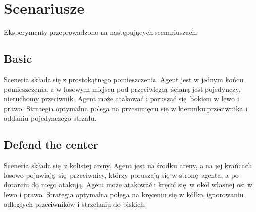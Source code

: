 \section{Scenariusze}
Eksperymenty przeprowadzono na następujących scenariuszach.

\subsection{Basic}
Sceneria składa się z prostokątnego pomieszczenia. Agent jest w jednym końcu pomieszczenia, a w losowym miejscu pod przeciwległą ścianą jest pojedynczy, nieruchomy przeciwnik. Agent może atakować i poruszać się bokiem w lewo i prawo. Strategia optymalna polega na przesunięciu się w kierunku przeciwnika i oddaniu pojedynczego strzału.
\subsection{Defend the center}
Sceneria składa się z kolistej areny. Agent jest na środku areny, a na jej krańcach losowo pojawiają się przeciwnicy, którzy poruszają się w stronę agenta, a po dotarciu do niego atakują. Agent może atakować i kręcić się w okół własnej osi w lewo i prawo. Strategia optymalna polega na kręceniu się w kółko, ignorowaniu odległych przeciwników i strzelaniu do biskich.
